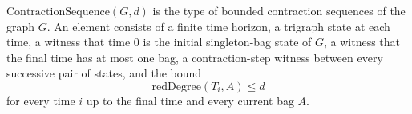 \(\mathrm{ContractionSequence}(G,d)\) is the type of bounded contraction
sequences of the graph \(G\).  An element consists of a finite time horizon,
a trigraph state at each time, a witness that time \(0\) is the initial
singleton-bag state of \(G\), a witness that the final time has at most one bag,
a contraction-step witness between every successive pair of states, and the
bound
\[
  \mathrm{redDegree}(T_i,A)\le d
\]
for every time \(i\) up to the final time and every current bag \(A\).
